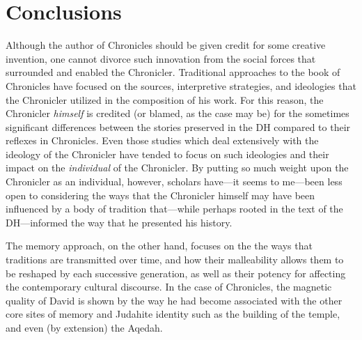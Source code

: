 \section{Conclusions}\label{conclusions}

Although the author of Chronicles should be given credit for some
creative invention, one cannot divorce such innovation from the social
forces that surrounded and enabled the Chronicler. Traditional
approaches to the book of Chronicles have focused on the sources,
interpretive strategies, and ideologies that the Chronicler utilized in
the composition of his work. For this reason, the Chronicler
\emph{himself} is credited (or blamed, as the case may be) for the
sometimes significant differences between the stories preserved in the
DH compared to their reflexes in Chronicles. Even those studies which
deal extensively with the ideology of the Chronicler have tended to
focus on such ideologies and their impact on the \emph{individual} of
the Chronicler. By putting so much weight upon the Chronicler as an
individual, however, scholars have---it seems to me---been less open to
considering the ways that the Chronicler himself may have been
influenced by a body of tradition that---while perhaps rooted in the
text of the DH---informed the way that he presented his history.

The memory approach, on the other hand, focuses on the the ways that
traditions are transmitted over time, and how their malleability allows
them to be reshaped by each successive generation, as well as their
potency for affecting the contemporary cultural discourse. In the case
of Chronicles, the magnetic quality of David is shown by the way he had
become associated with the other core sites of memory and Judahite
identity such as the building of the temple, and even (by extension) the
Aqedah.
